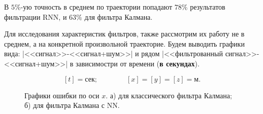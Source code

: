 \documentclass[a4paper,11pt]{article} %
\begin{document}
В $5\%$-ую точность в среднем по траектории попадают $78\%$ результатов фильтрации RNN,  и $63\%$ для фильтра Калмана. 

Для исследования характеристик  фильтров, также рассмотрим их работу не в среднем, а на конкретной произвольной траекторие.  Будем выводить графики вида: |<<сигнал>>-<<сигнал+шум>>| и рядом |<<фильтрованный сигнал>>-<<сигнал+шум>>| в зависимостри от времени  (\textbf{в секундах}).

$$[t]=\text{сек};\qquad\qquad[x]=[y]=[z]= \text{м}.$$


 \begin{figure}[h]
\begin{minipage}[h]{0.49\linewidth}
\end{minipage}
\hfill
\begin{minipage}[h]{0.49\linewidth}
\end{minipage}
\caption{Графики ошибки по оси $x$. а) для классического фильтра Калмана; б) для фильтра Калмана с NN.}
\label{batlx}
\end{figure}
\end{document}
